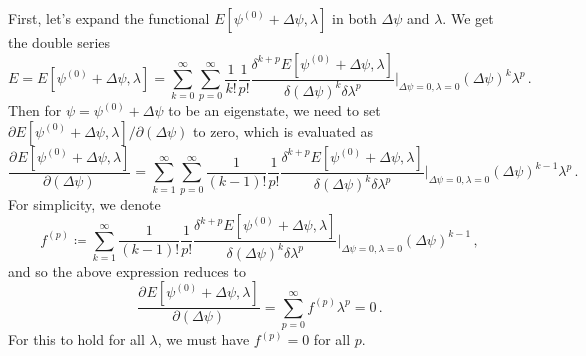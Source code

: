 \documentclass{article}
\theoremstyle{plain}\theoremheaderfont{\normalfont\itshape}\theorembodyfont{\rmfamily}\theoremseparator{.}\newtheorem*{rem}{Remark}\newtheorem*{ex}{Example}\newtheorem*{proof}{Proof}\newtheorem*{altp}{Alternative proof}
\theoremstyle{plain}\theoremheaderfont{\normalfont\bfseries}\theorembodyfont{\rmfamily}\theoremseparator{.}\newtheorem{thm}{Theorem}[section]\newtheorem{lem}[thm]{Lemma}\newtheorem{prop}[thm]{Proposition}\newtheorem*{cor}{Corollary}\newtheorem{defn}[thm]{Definition}\newtheorem{clm}[thm]{Claim}\newtheorem{clminproof}{Claim}
\theoremstyle{break}\theoremheaderfont{\normalfont\itshape}\theorembodyfont{\rmfamily}\theoremseparator{.\medskip}\newtheorem*{proofskip}{Proof}\newtheorem*{exs}{Examples}\newtheorem*{rems}{Remarks}
\theoremstyle{break}\theoremheaderfont{\normalfont\bfseries}\theorembodyfont{\rmfamily}\theoremseparator{.\medskip}\newtheorem{lemskip}[thm]{Lemma}\newtheorem{defnskip}[thm]{Definition}\newtheorem{propskip}[thm]{Proposition}\newtheorem{thmskip}[thm]{Theorem}
\numberwithin{equation}{section}
\newcommand{\pdv}[3][]{\frac{\partial^{#1} #2}{{\partial #3}^{#1}}}
\begin{document}
    First, let's expand the functional \(E[\psi^{(0)}+\Delta\psi,\lambda]\) in both \(\Delta\psi\) and \(\lambda\). We get the double series
    \begin{equation}\label{energy_double_expansion}
        E=E[\psi^{(0)}+\Delta\psi,\lambda]=\sum_{k=0}^{\infty}\sum_{p=0}^{\infty}\frac{1}{k!}\frac{1}{p!}\frac{\delta^{k+p}E[\psi^{(0)}+\Delta\psi,\lambda]}{\delta(\Delta\psi)^k\delta\lambda^p}\bigg|_{\Delta\psi=0,\lambda=0}(\Delta\psi)^k\lambda^p\,.
    \end{equation}
    Then for \(\psi=\psi^{(0)}+\Delta\psi\) to be an eigenstate, we need to set \(\partial E[\psi^{(0)}+\Delta\psi,\lambda]/\partial(\Delta\psi)\) to zero, which is evaluated as
    \begin{equation}
        \pdv{E[\psi^{(0)}+\Delta\psi,\lambda]}{(\Delta\psi)}=\sum_{k=1}^{\infty}\sum_{p=0}^{\infty}\frac{1}{(k-1)!}\frac{1}{p!}\frac{\delta^{k+p}E[\psi^{(0)}+\Delta\psi,\lambda]}{\delta(\Delta\psi)^k\delta\lambda^p}\bigg|_{\Delta\psi=0,\lambda=0}(\Delta\psi)^{k-1}\lambda^p\,.
    \end{equation}
    For simplicity, we denote
    \begin{equation}
        f^{(p)}\coloneqq\sum_{k=1}^{\infty}\frac{1}{(k-1)!}\frac{1}{p!}\frac{\delta^{k+p}E[\psi^{(0)}+\Delta\psi,\lambda]}{\delta(\Delta\psi)^k\delta\lambda^p}\bigg|_{\Delta\psi=0,\lambda=0}(\Delta\psi)^{k-1}\,,
    \end{equation}
    and so the above expression reduces to
    \begin{equation}
        \pdv{E[\psi^{(0)}+\Delta\psi,\lambda]}{(\Delta\psi)}=\sum_{p=0}^{\infty}f^{(p)}\lambda^p=0\,.
    \end{equation}
    For this to hold for all \(\lambda\), we must have \(f^{(p)}=0\) for all \(p\).
\end{document}
